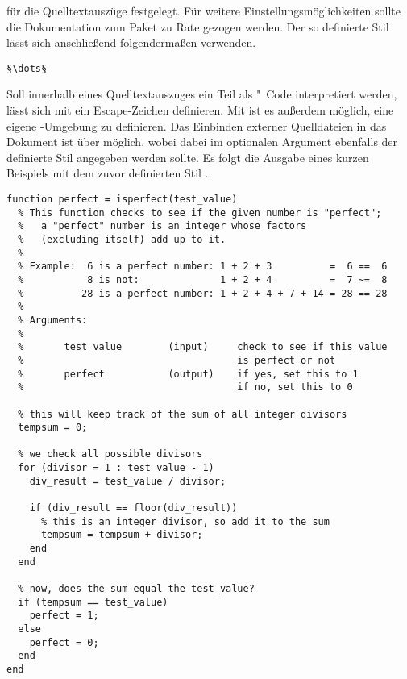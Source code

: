 \documentclass[%
  english,ngerman,%
  geometry=no,DIV=12,automark,%
]{tudscrartcl}
\begin{document}
für die Quelltextauszüge festgelegt. Für weitere Einstellungsmöglichkeiten 
sollte die Dokumentation zum Paket zu Rate gezogen werden. Der so definierte 
Stil lässt sich anschließend folgendermaßen verwenden.
%
\begin{Hint}
\begin{lstlisting}[style=matlab]
§\dots§
\end{lstlisting}
\end{Hint}
%
Soll innerhalb eines Quelltextauszuges ein Teil als "~Code 
interpretiert werden, lässt sich mit  ein Escape-Zeichen 
definieren. Mit  ist es außerdem möglich, eine eigene 
-Umgebung zu definieren. Das Einbinden externer Quelldateien 
in das Dokument ist über 
möglich, wobei dabei im optionalen Argument ebenfalls der definierte Stil 
angegeben werden sollte. Es folgt die Ausgabe eines kurzen Beispiels mit dem 
zuvor definierten Stil .
%
\begin{lstlisting}[style=matlab]
function perfect = isperfect(test_value)
  % This function checks to see if the given number is "perfect";
  %   a "perfect" number is an integer whose factors 
  %   (excluding itself) add up to it.
  %
  % Example:  6 is a perfect number: 1 + 2 + 3          =  6 ==  6
  %           8 is not:              1 + 2 + 4          =  7 ~=  8
  %          28 is a perfect number: 1 + 2 + 4 + 7 + 14 = 28 == 28
  %
  % Arguments:
  %
  %       test_value        (input)     check to see if this value 
  %                                     is perfect or not
  %       perfect           (output)    if yes, set this to 1
  %                                     if no, set this to 0
  
  % this will keep track of the sum of all integer divisors
  tempsum = 0;
  
  % we check all possible divisors
  for (divisor = 1 : test_value - 1)    
    div_result = test_value / divisor;
    
    if (div_result == floor(div_result)) 
      % this is an integer divisor, so add it to the sum
      tempsum = tempsum + divisor;
    end
  end
  
  % now, does the sum equal the test_value?
  if (tempsum == test_value) 
    perfect = 1;
  else
    perfect = 0;
  end
end
\end{lstlisting}
\end{document}
